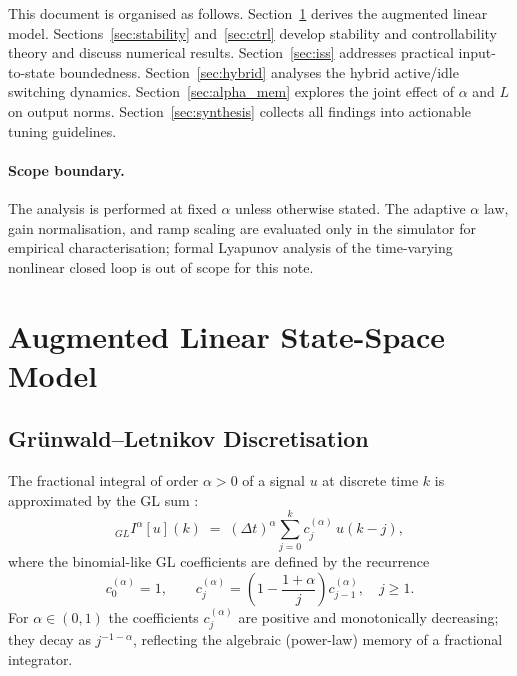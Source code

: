 \documentclass[11pt,a4paper]{article}
\theoremstyle{definition}
\begin{document}
This document is organised as follows.  Section~\ref{sec:model} derives the
augmented linear model.  Sections~\ref{sec:stability} and~\ref{sec:ctrl}
develop stability and controllability theory and discuss numerical results.
Section~\ref{sec:iss} addresses practical input-to-state boundedness.
Section~\ref{sec:hybrid} analyses the hybrid active/idle switching dynamics.
Section~\ref{sec:alpha_mem} explores the joint effect of $\alpha$ and $L$ on
output norms.  Section~\ref{sec:synthesis} collects all findings into
actionable tuning guidelines.

\paragraph{Scope boundary.}
The analysis is performed at fixed $\alpha$ unless otherwise stated.  The
adaptive $\alpha$ law, gain normalisation, and ramp scaling are evaluated only
in the simulator for empirical characterisation; formal Lyapunov analysis of
the time-varying nonlinear closed loop is out of scope for this note.

\section{Augmented Linear State-Space Model}
\label{sec:model}

\subsection{Grünwald–Letnikov Discretisation}

The fractional integral of order $\alpha > 0$ of a signal $u$ at discrete
time $k$ is approximated by the GL sum \cite{podlubny_1999,diethelm_2010}:
\begin{equation}
  {}_{GL}I^{\alpha}[u](k)
  \;=\;
  (\Delta t)^{\alpha}\sum_{j=0}^{k} c_j^{(\alpha)}\, u(k-j),
  \label{eq:gl_full}
\end{equation}
where the binomial-like GL coefficients are defined by the recurrence
\begin{equation}
  c_0^{(\alpha)} = 1,
  \qquad
  c_j^{(\alpha)} = \left(1 - \frac{1+\alpha}{j}\right) c_{j-1}^{(\alpha)},
  \quad j \geq 1.
  \label{eq:gl_coeff}
\end{equation}
For $\alpha \in (0,1)$ the coefficients $c_j^{(\alpha)}$ are positive and
monotonically decreasing; they decay as $j^{-1-\alpha}$, reflecting the
algebraic (power-law) memory of a fractional integrator.
\end{document}
